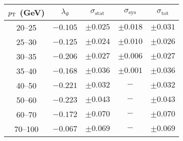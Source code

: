 \begin{tabular}{c|cccc}
$p_\text{T}$ (GeV) & $\lambda_\theta$ & $\sigma_{\text{stat}}$ & $\sigma_{\text{sys}}$ & $\sigma_{\text{tot}}$  \\
\hline
20--25& $-0.105$ & $\pm0.025$ & $\pm0.018$ & $\pm0.031$\\
25--30& $-0.125$ & $\pm0.024$ & $\pm0.010$ & $\pm0.026$\\
30--35& $-0.206$ & $\pm0.027$ & $\pm0.006$ & $\pm0.027$\\
35--40& $-0.168$ & $\pm0.036$ & $\pm0.001$ & $\pm0.036$\\
40--50& $-0.221$ & $\pm0.032$ & $-$ & $\pm0.032$\\
50--60& $-0.223$ & $\pm0.043$ & $-$ & $\pm0.043$\\
60--70& $-0.172$ & $\pm0.070$ & $-$ & $\pm0.070$\\
70--100& $-0.067$ & $\pm0.069$ & $-$ & $\pm0.069$\\
\end{tabular}

